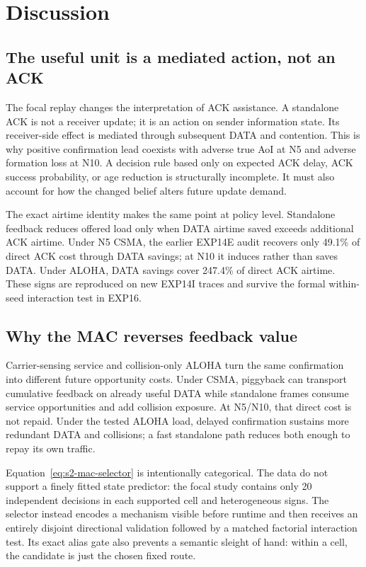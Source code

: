 \section{Discussion}
\label{sec:s2-discussion}

\subsection{The useful unit is a mediated action, not an ACK}

The focal replay changes the interpretation of ACK assistance. A standalone
ACK is not a receiver update; it is an action on sender information state. Its
receiver-side effect is mediated through subsequent DATA and contention. This
is why positive confirmation lead coexists with adverse true AoI at N5 and
adverse formation loss at N10. A decision rule based only on expected ACK
delay, ACK success probability, or age reduction is structurally incomplete.
It must also account for how the changed belief alters future update demand.

The exact airtime identity makes the same point at policy level. Standalone
feedback reduces offered load only when DATA airtime saved exceeds additional
ACK airtime. Under N5 CSMA, the earlier EXP14E audit recovers only 49.1\% of
direct ACK cost through DATA savings; at N10 it induces rather than saves DATA.
Under ALOHA, DATA savings cover 247.4\% of direct ACK airtime. These signs are
reproduced on new EXP14I traces and survive the formal within-seed interaction
test in EXP16.

\subsection{Why the MAC reverses feedback value}

Carrier-sensing service and collision-only ALOHA turn the same confirmation
into different future opportunity costs. Under CSMA, piggyback can transport
cumulative feedback on already useful DATA while standalone frames consume
service opportunities and add collision exposure. At N5/N10, that direct cost
is not repaid. Under the tested ALOHA load, delayed confirmation sustains more
redundant DATA and collisions; a fast standalone path reduces both enough to
repay its own traffic.

Equation~\eqref{eq:s2-mac-selector} is intentionally categorical. The data do
not support a finely fitted state predictor: the focal study contains only 20
independent decisions in each supported cell and heterogeneous signs. The
selector instead encodes a mechanism visible before runtime and then receives
an entirely disjoint directional validation followed by a matched factorial
interaction test. Its exact alias gate also prevents a semantic
sleight of hand: within a cell, the candidate is just the chosen fixed route.

